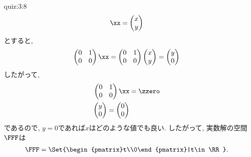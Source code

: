 \begin{answerof}{quiz:3:8} 
  \begin{align*}
    \xx=
    \begin{pmatrix}x\\y\end{pmatrix}
  \end{align*}
  とすると,
  \begin{align*}
     \begin{pmatrix}0&1\\0&0\end{pmatrix}
      \xx=
      \begin{pmatrix}0&1\\0&0\end{pmatrix}
        \begin{pmatrix}x\\y\end{pmatrix}
      = \begin{pmatrix}y\\0\end{pmatrix}  
  \end{align*}
  したがって,
  \begin{align*}
     \begin{pmatrix}0&1\\0&0\end{pmatrix}
      \xx&=\zzero\\
     \begin{pmatrix}y\\0\end{pmatrix}=\begin{pmatrix}0\\0\end{pmatrix}  
  \end{align*}
  であるので, $y=0$であれば$x$はどのような値でも良い.
  したがって,
  実数解の空間$\FFF$は
  \begin{align*}
    \FFF=
    \Set{\begin{pmatrix}t\\0\end{pmatrix}|t\in\RR}.
  \end{align*}
\end{answerof}

